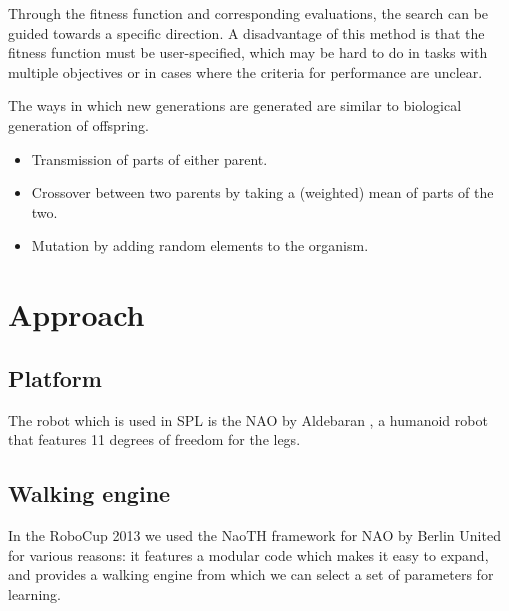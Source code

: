 \documentclass[a4paper, twocolumn]{article}
\begin{document}
Through the fitness function and corresponding evaluations, the search can be guided towards a specific direction. A disadvantage of this method is that the fitness function must be user-specified, which may be hard to do in tasks with multiple objectives or in cases where the criteria for performance are unclear. 

The ways in which new generations are generated are similar to biological generation of offspring.  
\begin{itemize} 
\item Transmission of parts of either parent.
\item Crossover between two parents by taking a (weighted) mean of parts of the two.
\item Mutation by adding random elements to the organism.
\end{itemize}


\section{Approach}
\subsection{Platform}
The robot which is used in SPL is the NAO by Aldebaran \citep{gouaillier2009mechatronic}, a humanoid robot that features 11 degrees of freedom for the legs.

\subsection{Walking engine}
In the RoboCup 2013 we used the NaoTH framework for NAO by Berlin United
\citep{naothdescription} for various reasons: it features a modular code which
makes it easy to expand, and provides a walking engine from which we can select
a set of parameters for learning. 
\end{document}
